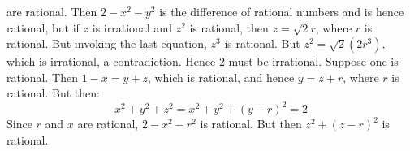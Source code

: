\documentclass{article}                                                        %
\begin{document}
\begin{solution}
        are rational. Then $2-x^{2}-y^{2}$ is the difference of rational numbers
        and is hence rational, but if $z$ is irrational and $z^{2}$ is rational,
        then $z=\sqrt{2}r$, where $r$ is rational. But invoking the last
        equation, $z^{3}$ is rational. But $z^{2}=\sqrt{2}(2r^{3})$, which is
        irrational, a contradiction. Hence 2 must be irrational. Suppose one is
        rational. Then $1-x=y+z$, which is rational, and hence $y=z+r$, where
        $r$ is rational. But then:
        \begin{equation}
            x^{2}+y^{2}+z^{2}=x^{2}+y^{2}+(y-r)^{2}=2
        \end{equation}
        Since $r$ and $x$ are rational, $2-x^{2}-r^{2}$ is rational.
        But then $z^{2}+(z-r)^{2}$ is rational.
    \end{solution}
\end{document}

